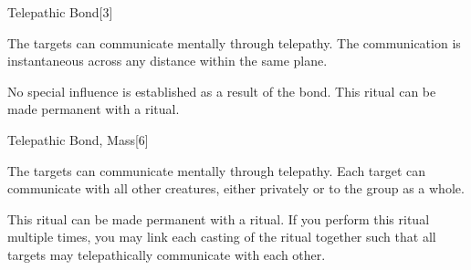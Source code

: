 \begin{spellsection}{Telepathic Bond}[3]
    \begin{spellheader}
    \end{spellheader}
    \begin{spellcontent}
        \begin{spelltargetinginfo}
            \spellrng{\rngclose}
        \end{spelltargetinginfo}
        \begin{spelleffects}

            \spellline
            \spelleffect The targets can communicate mentally through telepathy. The communication is instantaneous across any distance within the same plane.
            \spelldur \durext \dismissable
        \end{spelleffects}
    \end{spellcontent}
    \begin{spellfooter}
        \spellnotes No special influence is established as a result of the bond. This ritual can be made permanent with a  ritual.
    \end{spellfooter}
\end{spellsection}

\begin{spellsection}{Telepathic Bond, Mass}[6]
    \begin{spellheader}
    \end{spellheader}
    \begin{spellcontent}
        \begin{spelltargetinginfo}
        \end{spelltargetinginfo}
        \begin{spelleffects}

            \spellline
            \spelleffect The targets can communicate mentally through telepathy. Each target can communicate with all other creatures, either privately or to the group as a whole.
            \spelldur \durext \dismissable
        \end{spelleffects}
    \end{spellcontent}
    \begin{spellfooter}
        \spellnotes This ritual can be made permanent with a  ritual. If you perform this ritual multiple times, you may link each casting of the ritual together such that all targets may telepathically communicate with each other.
    \end{spellfooter}
\end{spellsection}

